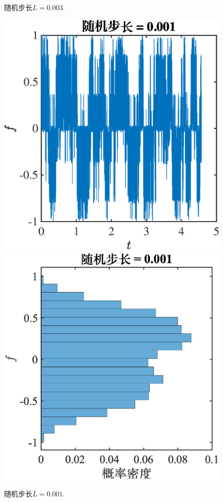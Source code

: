 \documentclass[12pt]{ctexart}
\begin{document}
\begin{figure}[htp]
	\caption{随机步长$L=0.003$.}
	\label{fig:13e-3}
\end{figure}

\begin{figure}[htp]
	\centering
	\includegraphics[scale=0.33]{f1e-3L.eps}
	\hspace{0.5in}
	\includegraphics[scale=0.33]{p1e-3L.eps}
	\caption{随机步长$L=0.001$.}
	\label{fig:11e-3}
\end{figure}
\end{document}
